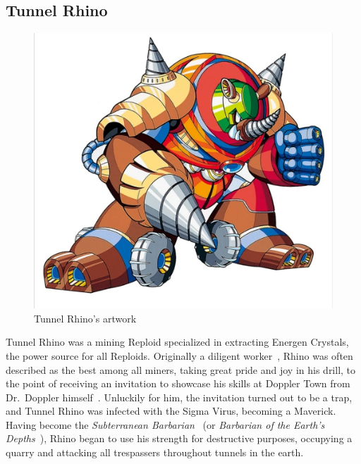 \subsection{Tunnel Rhino}\label{boss:Tunnel_rhino}
\begin{figure}[htp]
	\centering
	\includegraphics[height=\portraitsize]{figures/X3/Tunnel_rhino/tunnelrhino.png}
	\caption{Tunnel Rhino's artwork~\cite{book:MMX_Complete_art}}
\end{figure}
Tunnel Rhino was a mining Reploid specialized in extracting Energen Crystals, the power source for all Reploids. Originally a diligent worker~\cite{wayback:X3_resources}, Rhino was often described as the best among all miners, taking great pride and joy in his drill, to the point of receiving an invitation to showcase his skills at Doppler Town from Dr.~Doppler himself~\cite{Xcoll1:Manual_X3}. Unluckily for him, the invitation turned out to be a trap, and Tunnel Rhino was infected with the Sigma Virus, becoming a Maverick. Having become the \textit{Subterranean Barbarian}~\cite{book:MMX_Complete_art} (or \textit{Barbarian of the Earth's Depths}~\cite{wayback:X3_resources,book:Compendium}), Rhino began to use his strength for destructive purposes, occupying a quarry and attacking all trespassers throughout tunnels in the earth.

